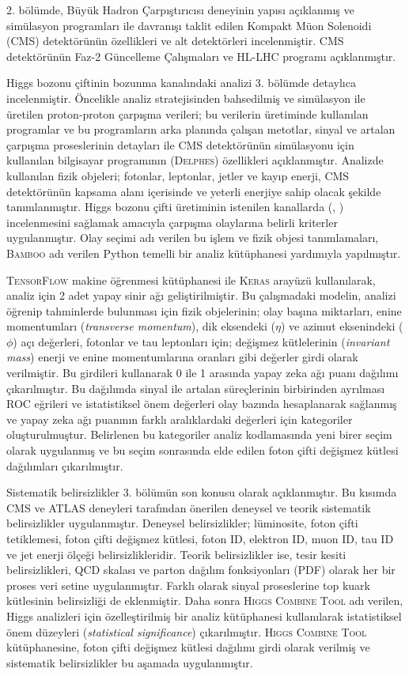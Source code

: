 2. bölümde, Büyük Hadron Çarpıştırıcısı deneyinin yapısı açıklanmış ve simülasyon programları ile davranışı taklit edilen Kompakt Müon Solenoidi (CMS) detektörünün özellikleri ve alt detektörleri incelenmiştir. CMS detektörünün Faz-2 Güncelleme Çalışmaları ve HL-LHC programı açıklanmıştır.

Higgs bozonu çiftinin \wwgg bozunma kanalındaki analizi  3. bölümde detaylıca incelenmiştir. Öncelikle analiz stratejisinden bahsedilmiş ve simülasyon ile üretilen proton-proton çarpışma verileri; bu verilerin üretiminde kullanılan programlar ve bu programların arka planında çalışan metotlar, sinyal ve artalan çarpışma proseslerinin detayları ile CMS detektörünün simülasyonu için kullanılan bilgisayar programının (\textsc{Delphes}) özellikleri açıklanmıştır. Analizde kullanılan fizik objeleri; fotonlar, leptonlar, jetler ve kayıp enerji, CMS detektörünün kapsama alanı içerisinde ve yeterli enerjiye sahip olacak şekilde tanımlanmıştır. Higgs bozonu çifti üretiminin istenilen kanallarda (\wwgg, \ttgg) incelenmesini sağlamak amacıyla çarpışma olaylarına belirli kriterler uygulanmıştır. Olay seçimi adı verilen bu işlem ve fizik objesi tanımlamaları, \textsc{Bamboo} adı verilen Python temelli bir analiz kütüphanesi yardımıyla yapılmıştır.

\textsc{TensorFlow} makine öğrenmesi kütüphanesi ile \textsc{Keras} arayüzü kullanılarak, analiz için 2 adet yapay sinir ağı geliştirilmiştir. Bu çalışmadaki modelin, analizi öğrenip tahminlerde bulunması için fizik objelerinin; olay başına miktarları, enine momentumları (\emph{transverse momentum}), dik eksendeki ($\eta$) ve azimut eksenindeki ($\phi$) açı değerleri, fotonlar ve tau leptonları için; değişmez kütlelerinin (\emph{invariant mass}) enerji ve enine momentumlarına oranları gibi değerler girdi olarak verilmiştir. Bu girdileri kullanarak 0 ile 1 arasında yapay zeka ağı puanı dağılımı çıkarılmıştır. Bu dağılımda sinyal ile artalan süreçlerinin birbirinden ayrılması ROC eğrileri ve istatistiksel önem değerleri olay bazında hesaplanarak sağlanmış ve yapay zeka ağı puanının farklı aralıklardaki değerleri için kategoriler oluşturulmuştur. Belirlenen bu kategoriler analiz kodlamasında yeni birer seçim olarak uygulanmış ve bu seçim sonrasında elde edilen foton çifti değişmez kütlesi dağılımları çıkarılmıştır.

Sistematik belirsizlikler 3. bölümün son konusu olarak açıklanmıştır. Bu kısımda CMS ve ATLAS deneyleri tarafından önerilen deneysel ve teorik sistematik belirsizlikler uygulanmıştır. Deneysel belirsizlikler; lüminosite, foton çifti tetiklemesi, foton çifti değişmez kütlesi, foton ID, elektron ID, muon ID, tau ID ve jet enerji ölçeği belirsizlikleridir. Teorik belirsizlikler ise, tesir kesiti belirsizlikleri, QCD skalası ve parton dağılım fonksiyonları (PDF) olarak her bir proses veri setine uygulanmıştır. Farklı olarak sinyal proseslerine top kuark kütlesinin belirsizliği de eklenmiştir. Daha sonra \textsc{Higgs Combine Tool} adı verilen, Higgs analizleri için özelleştirilmiş bir analiz kütüphanesi kullanılarak istatistiksel önem düzeyleri (\emph{statistical significance}) çıkarılmıştır. \textsc{Higgs Combine Tool} kütüphanesine, foton çifti değişmez kütlesi dağılımı girdi olarak verilmiş ve sistematik belirsizlikler bu aşamada uygulanmıştır.

